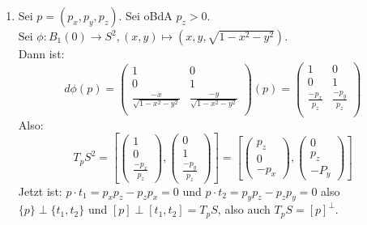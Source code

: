 \begin{solution}
\begin{enumerate}[label= (\alph*)]
    \item Sei \( p = (p_x, p_y, p_z) \). Sei oBdA \( p_z > 0 \). \\
    Sei \( \phi : B_1(0) \to S^2, (x,y) \mapsto (x,y,\sqrt{ 1- x^2-y^2}) \). \\
    Dann ist:
    \begin{equation*} 
      d \phi(p) = 
      \begin{pmatrix}
        1 & 0 \\
        0 & 1 \\
        \frac{-x}{\sqrt{ 1 - x^2 -y^2}} & \frac{-y}{\sqrt{ 1 - x^2 -y^2}} \\
      \end{pmatrix}(p) = 
      \begin{pmatrix}
        1 & 0 \\
        0 & 1 \\
        \frac{-p_x}{p_z} & \frac{-p_y}{p_z} \\
      \end{pmatrix} 
    \end{equation*}
    Also:
    \begin{equation*}
      {T_p S}^2 = \left[
      \begin{pmatrix}
        1 \\
        0 \\
        \frac{-p_x}{p_z}
      \end{pmatrix},
      \begin{pmatrix}
        0 \\
        1 \\
        \frac{-p_y}{p_z}
      \end{pmatrix}
      \right] = \left[
      \begin{pmatrix}
        p_z\\
        0 \\
        -p_x
      \end{pmatrix},
      \begin{pmatrix}
        0 \\
        p_z \\
        -P_y
      \end{pmatrix}
      \right]
    \end{equation*}
    Jetzt ist: \( p \cdot t_1 = p_x p_z - p_z p_x = 0 \) und \( p \cdot t_2 = p_y p_z - p_z p_y = 0 \) also \\
    \( \{ p \} \perp \{ t_1,t_2 \} \) und \( [p] \perp [t_1,t_2] = T_p S \), also auch \( T_p S = {[p]}^{\perp} \).
  \end{enumerate}
\end{solution}

